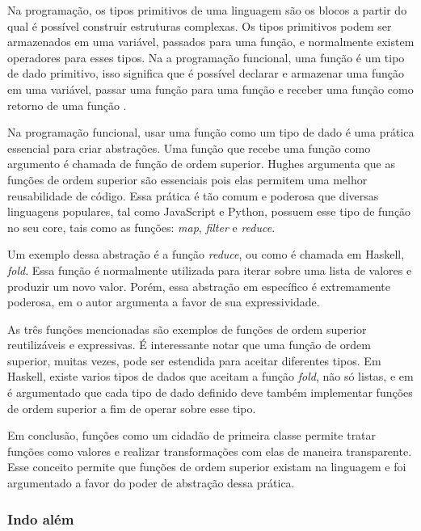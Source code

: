 Na programação, os tipos primitivos de uma linguagem são os blocos a partir do qual é possível construir estruturas complexas.
Os tipos primitivos podem ser armazenados em uma variável, passados para uma função, e normalmente existem operadores para esses tipos.
Na a programação funcional, uma função é um tipo de dado primitivo, isso significa que é possível declarar e armazenar uma função em uma variável, passar uma função para uma função e receber uma função como retorno de uma função \cite{whyfpm}.

Na programação funcional, usar uma função como um tipo de dado é uma prática essencial para criar abstrações.
Uma função que recebe uma função como argumento é chamada de função de ordem superior.
Hughes \cite{whyfpm} argumenta que as funções de ordem superior são essenciais pois elas permitem uma melhor reusabilidade de código.
Essa prática é tão comum e poderosa que diversas linguagens populares, tal como JavaScript e Python, possuem esse tipo de função no seu core, tais como as funções: \emph{map}, \emph{filter} e \emph{reduce}.

Um exemplo dessa abstração é a função \emph{reduce}, ou como é chamada em Haskell, \emph{fold}.
Essa função é normalmente utilizada para iterar sobre uma lista de valores e produzir um novo valor.
Porém, essa abstração em específico é extremamente poderosa, em \cite{graham} o autor argumenta a favor de sua expressividade.

As três funções mencionadas são exemplos de funções de ordem superior reutilizáveis e expressivas.
É interessante notar que uma função de ordem superior, muitas vezes, pode ser estendida para aceitar diferentes tipos.
Em Haskell, existe varios tipos de dados que aceitam a função \emph{fold}, não só listas, e em \cite{whyfpm} é argumentado que cada tipo de dado definido deve também implementar funções de ordem superior a fim de operar sobre esse tipo.


Em conclusão, funções como um cidadão de primeira classe permite tratar funções como valores e realizar transformações com elas de maneira transparente.
Esse conceito permite que funções de ordem superior existam na linguagem e foi argumentado a favor do poder de abstração dessa prática.

\subsubsection{Indo além}

